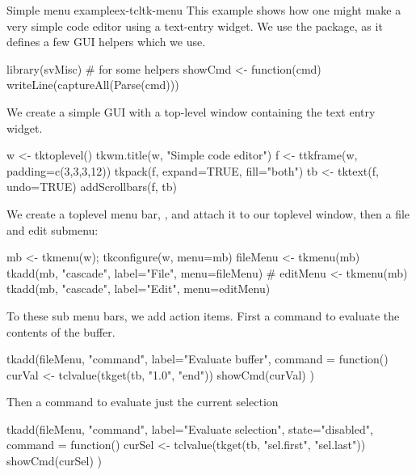 \begin{example}{Simple menu example}{ex-tcltk-menu}
This example shows how one might make a very simple code editor using a text-entry widget. We use the  package, as it defines a few GUI helpers which we use.
\begin{Schunk}
\begin{Sinput}
 library(svMisc)                         # for some helpers
 showCmd <- function(cmd) writeLine(captureAll(Parse(cmd)))
\end{Sinput}
\end{Schunk}

We create a simple GUI with a top-level window containing the text entry widget.
\begin{Schunk}
\begin{Sinput}
 w <- tktoplevel()
 tkwm.title(w, "Simple code editor")
 f <- ttkframe(w, padding=c(3,3,3,12)) 
 tkpack(f, expand=TRUE, fill="both")
 tb <- tktext(f, undo=TRUE)
 addScrollbars(f, tb)
\end{Sinput}
\end{Schunk}

We create a toplevel menu bar, , and attach it to our
toplevel window, then a file and edit submenu:
\begin{Schunk}
\begin{Sinput}
 mb <- tkmenu(w); tkconfigure(w, menu=mb)
 fileMenu <- tkmenu(mb)
 tkadd(mb, "cascade", label="File", menu=fileMenu)
 #
 editMenu <- tkmenu(mb)
 tkadd(mb, "cascade", label="Edit", menu=editMenu)
\end{Sinput}
\end{Schunk}

To these sub menu bars, we add action items. First a command to evaluate the contents of the buffer.
\begin{Schunk}
\begin{Sinput}
 tkadd(fileMenu, "command", label="Evaluate buffer",
       command = function() {
         curVal <- tclvalue(tkget(tb, "1.0", "end"))
         showCmd(curVal)
       })
\end{Sinput}
\end{Schunk}

Then a command to evaluate just the current selection
\begin{Schunk}
\begin{Sinput}
 tkadd(fileMenu, "command", label="Evaluate selection",
       state="disabled",
       command = function() {
         curSel <- tclvalue(tkget(tb, "sel.first", "sel.last"))
         showCmd(curSel)
       })
\end{Sinput}
\end{Schunk}


\end{example}
